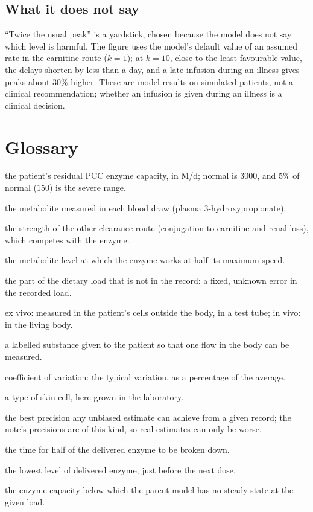 \documentclass[11pt,a4paper]{article}
\begin{document}
\subsection{What it does not say} ``Twice the usual peak'' is a yardstick, chosen because the
model does not say which level is harmful. The figure uses the model's default value of an
assumed rate in the carnitine route ($k=1$); at $k=10$, close to the least favourable value, the
delays shorten by less than a day, and a late infusion during an illness gives peaks about $30\%$
higher. These are model results on simulated patients, not a clinical
recommendation; whether an infusion is given during an illness is a clinical decision.

\section{Glossary}

\begin{description}[leftmargin=1.4em,style=nextline]
\item[$\theta$ (capacity)] the patient's residual PCC enzyme capacity, in \textmu M/d; normal
is $3000$, and $5\%$ of normal ($150$) is the severe range.
\item[Marker] the metabolite measured in each blood draw (plasma 3-hydroxypropionate).
\item[$k_e$] the strength of the other clearance route (conjugation to carnitine and renal
loss), which competes with the enzyme.
\item[$K_m$] the metabolite level at which the enzyme works at half its maximum speed.
\item[$b$ (load bias)] the part of the dietary load that is not in the record: a fixed, unknown
error in the recorded load.
\item[Ex vivo, in vivo] ex vivo: measured in the patient's cells outside the body, in a test
tube; in vivo: in the living body.
\item[Tracer] a labelled substance given to the patient so that one flow in the body can be
measured.
\item[CV] coefficient of variation: the typical variation, as a percentage of the average.
\item[Fibroblast] a type of skin cell, here grown in the laboratory.
\item[Cram\'er--Rao bound] the best precision any unbiased estimate can achieve from a given
record; the note's precisions are of this kind, so real estimates can only be worse.
\item[Half-life] the time for half of the delivered enzyme to be broken down.
\item[Trough] the lowest level of delivered enzyme, just before the next dose.
\item[Critical capacity] the enzyme capacity below which the parent model has no steady state
at the given load.
\end{description}
\end{document}
